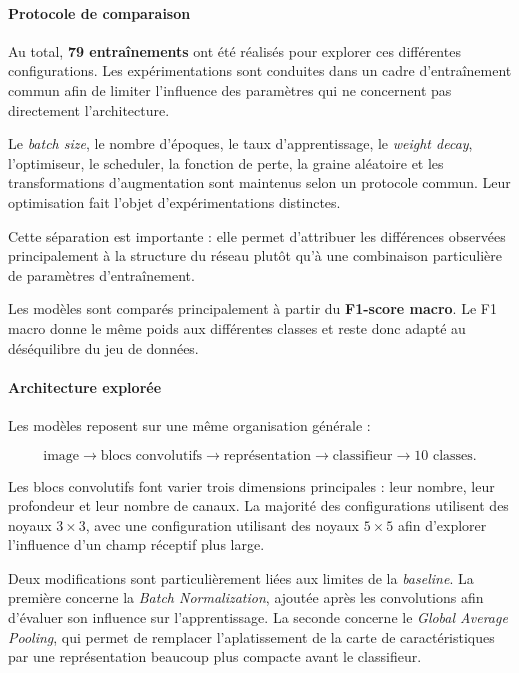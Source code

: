 \paragraph{Protocole de comparaison}

Au total, \textbf{79 entraînements} ont été réalisés pour explorer ces différentes configurations.
Les expérimentations sont conduites dans un cadre d'entraînement commun afin de limiter l'influence des paramètres qui ne concernent pas directement l'architecture.

Le \textit{batch size}, le nombre d'époques, le taux d'apprentissage, le \textit{weight decay}, l'optimiseur, le scheduler, la fonction de perte, la graine aléatoire et les transformations d'augmentation sont maintenus selon un protocole commun.
Leur optimisation fait l'objet d'expérimentations distinctes.

Cette séparation est importante : elle permet d'attribuer les différences observées principalement à la structure du réseau plutôt qu'à une combinaison particulière de paramètres d'entraînement.

Les modèles sont comparés principalement à partir du \textbf{F1-score macro}.
Le F1 macro donne le même poids aux différentes classes et reste donc adapté au déséquilibre du jeu de données.

\paragraph{Architecture explorée}

Les modèles reposent sur une même organisation générale :

$$
\text{image} \rightarrow
\text{blocs convolutifs} \rightarrow
\text{représentation} \rightarrow
\text{classifieur} \rightarrow
\text{10 classes}.
$$

Les blocs convolutifs font varier trois dimensions principales : leur nombre, leur profondeur et leur nombre de canaux.
La majorité des configurations utilisent des noyaux $3\times3$, avec une configuration utilisant des noyaux $5\times5$ afin d'explorer l'influence d'un champ réceptif plus large.

Deux modifications sont particulièrement liées aux limites de la \emph{baseline}.
La première concerne la \textit{Batch Normalization}, ajoutée après les convolutions afin d'évaluer son influence sur l'apprentissage.
La seconde concerne le \textit{Global Average Pooling}, qui permet de remplacer l'aplatissement de la carte de caractéristiques par une représentation beaucoup plus compacte avant le classifieur.

